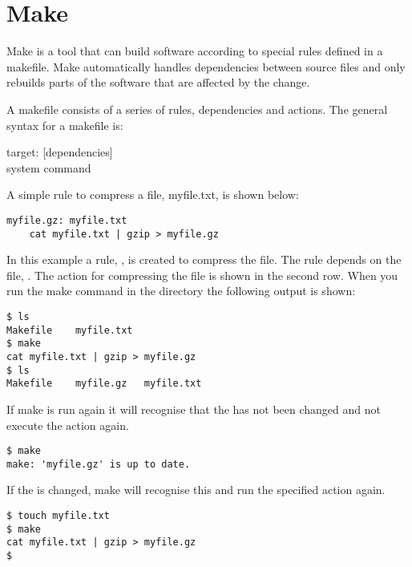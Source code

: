 \section{Make}

Make is a tool that can build software according to special rules defined in a makefile. Make automatically handles dependencies between source files and only rebuilds parts of the software that are affected by the change.

A makefile consists of a series of rules, dependencies and actions. The general syntax for a makefile is:

\begin{msyntax}
target: [dependencies]\\
\ftab system command
\end{msyntax}

A simple rule to compress a file, myfile.txt, is shown below:

\mmode

\begin{lstlisting}
myfile.gz: myfile.txt
	cat myfile.txt | gzip > myfile.gz
\end{lstlisting}

In this example a rule, , is created to compress the file. The rule depends on the file, . The action for compressing the file is shown in the second row. When you run the make command in the directory the following output is shown:

\cmdmode

\begin{lstlisting}
$ ls
Makefile	myfile.txt
$ make
cat myfile.txt | gzip > myfile.gz
$ ls
Makefile	myfile.gz	myfile.txt
\end{lstlisting} 

If make is run again it will recognise that the  has not been changed and not execute the action again.

\begin{lstlisting}
$ make
make: 'myfile.gz' is up to date.
\end{lstlisting}

If the  is changed, make will recognise this and run the specified action again.

\begin{lstlisting}
$ touch myfile.txt
$ make
cat myfile.txt | gzip > myfile.gz
$ 
\end{lstlisting}

